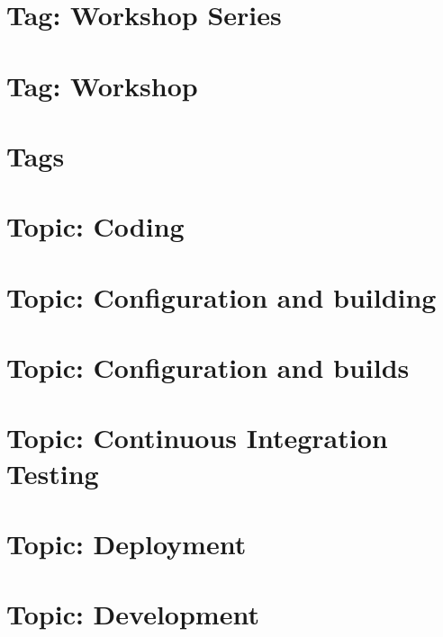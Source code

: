 \documentclass[twoside]{book}
\newcommand{\+}{\discretionary{\mbox{\scriptsize$\hookleftarrow$}}{}{}}
\begin{document}
\chapter{Tag\+: Workshop Series}
\label{md_markdown_tag_workshop-series}

\chapter{Tag\+: Workshop}
\label{md_markdown_tag_workshop}

\chapter{Tags}
\label{md_markdown_tags}

\chapter{Topic\+: Coding}
\label{md_markdown_topic_coding}

\chapter{Topic\+: Configuration and building}
\label{md_markdown_topic_configuration_and_building}

\chapter{Topic\+: Configuration and builds}
\label{md_markdown_topic_configuration_and_builds}

\chapter{Topic\+: Continuous Integration Testing}
\label{md_markdown_topic_continuous_integration_testing}

\chapter{Topic\+: Deployment}
\label{md_markdown_topic_deployment}

\chapter{Topic\+: Development}
\label{md_markdown_topic_development}

\end{document}

